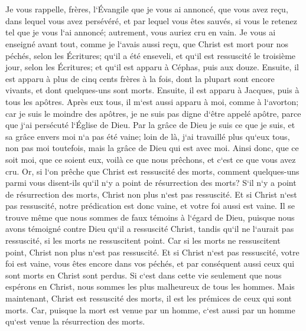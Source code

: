 \chapter{}

\verse Je vous rappelle, frères, l`Évangile que je vous ai annoncé, que vous avez reçu, dans lequel vous avez persévéré, 
\verse et par lequel vous êtes sauvés, si vous le retenez tel que je vous l`ai annoncé; autrement, vous auriez cru en vain. 
\verse Je vous ai enseigné avant tout, comme je l`avais aussi reçu, que Christ est mort pour nos péchés, selon les Écritures; 
\verse qu`il a été enseveli, et qu`il est ressuscité le troisième jour, selon les Écritures; 
\verse et qu`il est apparu à Céphas, puis aux douze. 
\verse Ensuite, il est apparu à plus de cinq cents frères à la fois, dont la plupart sont encore vivants, et dont quelques-uns sont morts. 
\verse Ensuite, il est apparu à Jacques, puis à tous les apôtres. 
\verse Après eux tous, il m`est aussi apparu à moi, comme à l`avorton; 
\verse car je suis le moindre des apôtres, je ne suis pas digne d`être appelé apôtre, parce que j`ai persécuté l`Église de Dieu. 
\verse Par la grâce de Dieu je suis ce que je suis, et sa grâce envers moi n`a pas été vaine; loin de là, j`ai travaillé plus qu`eux tous, non pas moi toutefois, mais la grâce de Dieu qui est avec moi. 
\verse Ainsi donc, que ce soit moi, que ce soient eux, voilà ce que nous prêchons, et c`est ce que vous avez cru. 
\verse Or, si l`on prêche que Christ est ressuscité des morts, comment quelques-uns parmi vous disent-ils qu`il n`y a point de résurrection des morts? 
\verse S`il n`y a point de résurrection des morts, Christ non plus n`est pas ressuscité. 
\verse Et si Christ n`est pas ressuscité, notre prédication est donc vaine, et votre foi aussi est vaine. 
\verse Il se trouve même que nous sommes de faux témoins à l`égard de Dieu, puisque nous avons témoigné contre Dieu qu`il a ressuscité Christ, tandis qu`il ne l`aurait pas ressuscité, si les morts ne ressuscitent point. 
\verse Car si les morts ne ressuscitent point, Christ non plus n`est pas ressuscité. 
\verse Et si Christ n`est pas ressuscité, votre foi est vaine, vous êtes encore dans vos péchés, 
\verse et par conséquent aussi ceux qui sont morts en Christ sont perdus. 
\verse Si c`est dans cette vie seulement que nous espérons en Christ, nous sommes les plus malheureux de tous les hommes. 
\verse Mais maintenant, Christ est ressuscité des morts, il est les prémices de ceux qui sont morts. 
\verse Car, puisque la mort est venue par un homme, c`est aussi par un homme qu`est venue la résurrection des morts. 
